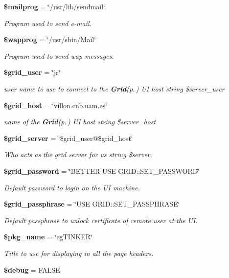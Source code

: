 \begin{CompactItemize}
{\bf \$mailprog} = \char`\"{}/usr/lib/sendmail\char`\"{}
\begin{CompactList}\small\item\em Program used to send e-mail. \item\end{CompactList}\item 
{\bf \$wapprog} = \char`\"{}/usr/sbin/Mail\char`\"{}
\begin{CompactList}\small\item\em Program used to send wap messages. \item\end{CompactList}\item 
{\bf \$grid\_\-user} = \char`\"{}jr\char`\"{}
\begin{CompactList}\small\item\em user name to use to connect to the {\bf Grid}{\rm (p.\,\pageref{classGrid})} UI host  string \$server\_\-user \item\end{CompactList}\item 
{\bf \$grid\_\-host} = \char`\"{}villon.cnb.uam.es\char`\"{}
\begin{CompactList}\small\item\em name of the {\bf Grid}{\rm (p.\,\pageref{classGrid})} UI host  string \$server\_\-host \item\end{CompactList}\item 
{\bf \$grid\_\-server} = \char`\"{}\$grid\_\-user@\$grid\_\-host\char`\"{}
\begin{CompactList}\small\item\em Who acts as the grid server for us  string \$server. \item\end{CompactList}\item 
{\bf \$grid\_\-password} = \char`\"{}BETTER USE GRID::SET\_\-PASSWORD\char`\"{}
\begin{CompactList}\small\item\em Default password to login on the UI machine. \item\end{CompactList}\item 
{\bf \$grid\_\-passphrase} = \char`\"{}USE GRID::SET\_\-PASSPHRASE\char`\"{}
\begin{CompactList}\small\item\em Default passphrase to unlock certificate of remote user at the UI. \item\end{CompactList}\item 
{\bf \$pkg\_\-name} = \char`\"{}eg\-TINKER\char`\"{}
\begin{CompactList}\small\item\em Title to use for displaying in all the page headers. \item\end{CompactList}\item 
{\bf \$debug} = FALSE
\end{CompactItemize}


